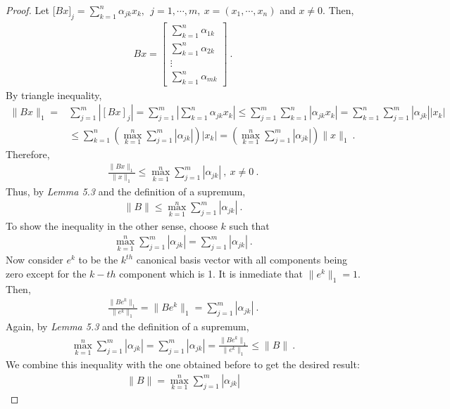 \begin{questions}
\begin{solution}
\begin{proof}
Let [$Bx]_j = \sum_{k=1}^{n} \alpha_{jk}x_k,~~ j = 1, \cdots , m,~ x = (x_1, \cdots , x_n)$ and $x \neq 0$. Then,
\begin{align*}
Bx = \begin{bmatrix}
\sum_{k=1}^{n} \alpha_{1k} \\
\sum_{k=1}^{n} \alpha_{2k} \\
\vdots \\
\sum_{k=1}^{n} \alpha_{mk}
\end{bmatrix}~.
\end{align*}
By triangle inequality,
\begin{align*}
\|Bx\|_1 = & \sum_{j=1}^{m} |[Bx]_j| = \sum_{j=1}^{m} | \sum_{k=1}^{n} \alpha_{jk}x_k| \leq \sum_{j=1}^{m} \sum_{k=1}^{n} |\alpha_{jk}x_k| = \sum_{k=1}^{n} \sum_{j=1}^{m} |\alpha_{jk}||x_k| \\ 
& \leq \sum_{k=1}^{n} \left( \max_{k=1}^{n} \sum_{j=1}^{m} |\alpha_{jk}| \right) |x_k| = \left( \max_{k=1}^{n} \sum_{j=1}^{m} |\alpha_{jk}| \right) \|x\|_1~.
\end{align*}
Therefore,
\begin{align*}
\frac{\|Bx\|_1}{\|x\|_1} \leq  \max_{k=1}^{n} \sum_{j=1}^{m} |\alpha_{jk}|~,~x\neq 0~.
\end{align*}
Thus, by \textit{Lemma 5.3} and the definition of a supremum,
\begin{align*}
 \|B\| \leq \max_{k=1}^{n} \sum_{j=1}^{m} |\alpha_{jk}|~.
\end{align*}
To show the inequality in the other sense, choose $k$ such that
\begin{align*}
\max_{k=1}^{n} \sum_{j=1}^{m} |\alpha_{jk}| = \sum_{j=1}^{m} |\alpha_{jk}|~.
\end{align*}
Now consider $e^k$ to be the $k^{th}$ canonical basis vector with all components being zero except for the $k-th$ component which is 1. It is inmediate that $\|e^k\|_1 = 1$. Then,
\begin{align*}
 \frac{\|Be^k\|_1}{\|e^k\|_1} = \|Be^k\|_1  = \sum_{j=1}^{m} |\alpha_{jk}|~.
\end{align*}
Again, by \textit{Lemma 5.3} and the definition of a supremum,
\begin{align*}
\max_{k=1}^{n} \sum_{j=1}^{m} |\alpha_{jk}| = \sum_{j=1}^{m} |\alpha_{jk}| = \frac{\|Be^k\|_1}{\|e^k\|_1} \leq \|B\|~.
\end{align*}
We combine this inequality with the one obtained before to get the desired result:
\begin{align*}
\|B\| = \max_{k=1}^{n} \sum_{j=1}^{m} |\alpha_{jk}|
\end{align*}

\end{proof}
\end{solution}
\end{questions}